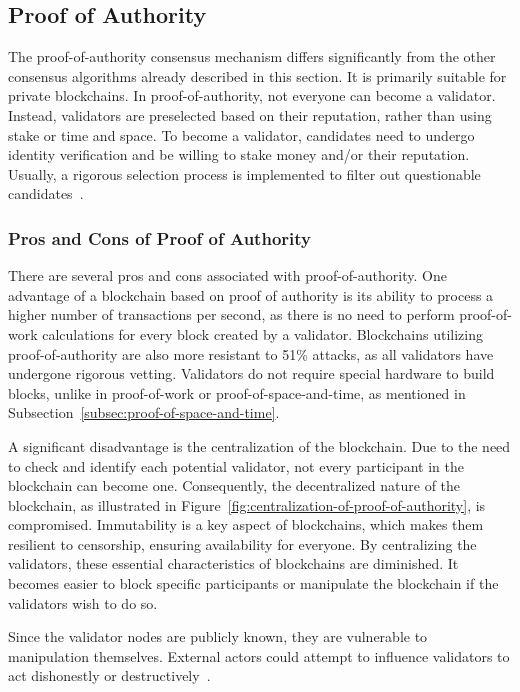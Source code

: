 \subsection{Proof of Authority}\label{subsec:proof-of-authority}
The proof-of-authority consensus mechanism differs significantly from the other consensus algorithms already described in this section.
It is primarily suitable for private blockchains.
In proof-of-authority, not everyone can become a validator.
Instead, validators are preselected based on their reputation, rather than using stake or time and space.
To become a validator, candidates need to undergo identity verification and be willing to stake money and/or their reputation.
Usually, a rigorous selection process is implemented to filter out questionable candidates~\cite{coindesk-poa}.

\subsubsection{Pros and Cons of Proof of Authority}
There are several pros and cons associated with proof-of-authority.
One advantage of a blockchain based on proof of authority is its ability to process a higher number of transactions per second, as there is no need to perform proof-of-work calculations for every block created by a validator.
Blockchains utilizing proof-of-authority are also more resistant to 51\% attacks, as all validators have undergone rigorous vetting.
Validators do not require special hardware to build blocks, unlike in proof-of-work or proof-of-space-and-time, as mentioned in Subsection~\ref{subsec:proof-of-space-and-time}.

A significant disadvantage is the centralization of the blockchain.
Due to the need to check and identify each potential validator, not every participant in the blockchain can become one.
Consequently, the decentralized nature of the blockchain, as illustrated in Figure~\ref{fig:centralization-of-proof-of-authority}, is compromised.
Immutability is a key aspect of blockchains, which makes them resilient to censorship, ensuring availability for everyone.
By centralizing the validators, these essential characteristics of blockchains are diminished.
It becomes easier to block specific participants or manipulate the blockchain if the validators wish to do so.

Since the validator nodes are publicly known, they are vulnerable to manipulation themselves.
External actors could attempt to influence validators to act dishonestly or destructively~\cite{insidecrypto-poa,coindesk-poa}.


